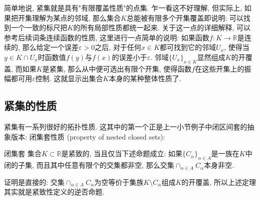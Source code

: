 简单地说, 紧集就是具有"有限覆盖性质"的点集. 乍一看这不好理解, 但实际上, 如果把开集理解为某点的邻域, 那么集合$K$总能被有限多个开集覆盖即说明: 可以找到一个一致的标尺把$K$的所有局部性质都统一起来. 关于这一点的详细解释, 可以参考后续词条连续函数的性质, 这里进行一点简单的说明: 如果函数$f:K\to\mathbb{R}$是连续的, 那么给定一个误差$\varepsilon>0$之后, 对于任何$x\in K$都可找到它的邻域$U_{x}$, 使得当$y\in K\cap U_x$时函数值$f(y)$与$f(x)$的误差小于$\varepsilon$. 邻域$\{U_x\}_{x\in K}$显然组成$K$的开覆盖, 而如果$K$是紧集, 那么从中便可选出有限个开集, 使得函数$f$在这些开集上的振幅都可用$\varepsilon$控制. 这就显示出集合$K$本身的某种整体性质了.

\subsection{紧集的性质}
紧集有一系列很好的拓扑性质. 这其中的第一个正是上一小节例子中闭区间套的抽象版本: 闭集套性质 (property of nested closed sets):

\begin{theorem}{闭集套}
集合$K\subset\mathbb{R}$是紧致的, 当且仅当下述命题成立: 如果$\{C_\alpha\}_{\alpha\in A}$是一族在$K$中闭的子集, 而且其中任意有限个的交集都非空, 那么交集$\cap_{\alpha\in A}C_\alpha$本身非空. 
\end{theorem}

证明是直接的: 交集$\cap_{\alpha\in A}C_\alpha$为空等价于集族$K\setminus C_\alpha$组成$K$的开覆盖, 所以上述定理其实就是紧致性定义的逆否命题.

